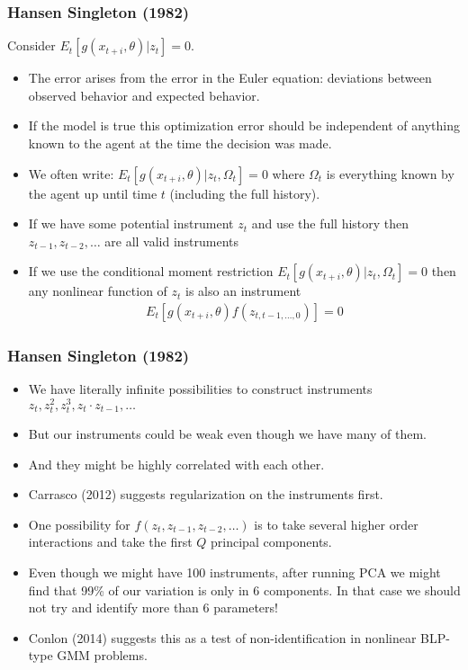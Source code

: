 \documentclass[xcolor=pdftex,dvipsnames,table,mathserif,aspectratio=169]{beamer}
\begin{document}
\begin{frame}
\frametitle{Hansen Singleton (1982)}
Consider $E_t [g(x_{t+i},\theta) | z_t] = 0$.
\begin{itemize}
\item The error arises from the error in the Euler equation: deviations between observed behavior and expected behavior.
\item If the model is true this optimization error should be independent of anything known to the agent at the time the decision was made.
\item We often write: $E_t [g(x_{t+i},\theta) | z_t, \Omega_t] = 0$ where $\Omega_t$ is everything known by the agent up until time $t$ (including the full history).
\item If we have some potential instrument $z_t$ and use the full history then $z_{t-1},z_{t-2},\ldots$ are all valid instruments
\item If we use the conditional moment restriction $E_t [g(x_{t+i},\theta) | z_t, \Omega_t] = 0$ then any nonlinear function of $z_t$ is also an instrument
\begin{eqnarray*}
E_t [g(x_{t+i},\theta) f(z_{t,t-1,\ldots,0}) ]  = 0
\end{eqnarray*}
\end{itemize}
\end{frame}


\begin{frame}
\frametitle{Hansen Singleton (1982)}
\begin{itemize}
\item We have literally infinite possibilities to construct instruments $z_t, z_t^2, z_t^3, z_t \cdot z_{t-1}, \ldots$
\item But our instruments could be \alert{weak} even though we have many of them.
\item And they might be highly correlated with each other.
\item Carrasco (2012) suggests \alert{regularization} on the instruments first.
\item One possibility for $f(z_{t},z_{t-1},z_{t-2},\ldots)$ is to take several higher order interactions and take the first $Q$ principal components.
\item Even though we might have 100 instruments, after running PCA we might find that 99\% of our variation is only in 6 components. In that case we should not try and identify more than 6 parameters!
\item Conlon (2014) suggests this as a test of non-identification in nonlinear BLP-type GMM problems.
\end{itemize}
\end{frame}
\end{document}
